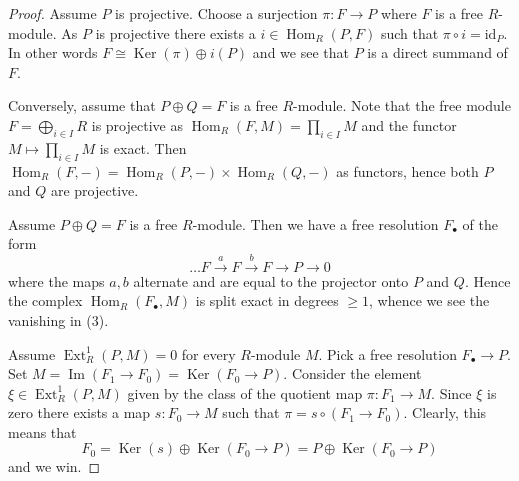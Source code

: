 \documentclass[10pt,a4paper]{amsart}
\theoremstyle{plain}
\theoremstyle{definition}
\theoremstyle{remark}
\numberwithin{equation}{subsection}
\def\Hom{\mathop{\mathrm{Hom}}\nolimits}
\def\Ext{\mathop{\mathrm{Ext}}\nolimits}
\def\Ker{\mathop{\mathrm{Ker}}}
\def\Im{\mathop{\mathrm{Im}}}
\begin{document}
\begin{proof}
Assume $P$ is projective. Choose a surjection $\pi : F \to P$ where $F$
is a free $R$-module. As $P$ is projective there exists a
$i \in \Hom_R(P, F)$ such that $\pi \circ i = \text{id}_P$.
In other words $F \cong \Ker(\pi) \oplus i(P)$ and we see
that $P$ is a direct summand of $F$.

\medskip\noindent
Conversely, assume that $P \oplus Q = F$ is a free $R$-module.
Note that the free module $F = \bigoplus_{i \in I} R$ is projective
as $\Hom_R(F, M) = \prod_{i \in I} M$ and the functor
$M \mapsto \prod_{i \in I} M$ is exact.
Then $\Hom_R(F, -) = \Hom_R(P, -) \times \Hom_R(Q, -)$
as functors, hence both $P$ and $Q$ are projective.

\medskip\noindent
Assume $P \oplus Q = F$ is a free $R$-module. Then we have a
free resolution $F_\bullet$ of the form
$$
\ldots F \xrightarrow{a} F \xrightarrow{b} F \to P \to 0
$$
where the maps $a, b$ alternate and are equal to the projector onto
$P$ and $Q$. Hence the complex $\Hom_R(F_\bullet, M)$ is split
exact in degrees $\geq 1$, whence we see the vanishing in (3).

\medskip\noindent
Assume $\Ext^1_R(P, M) = 0$ for every $R$-module $M$.
Pick a free resolution $F_\bullet \to P$. Set
$M = \Im(F_1 \to F_0) = \Ker(F_0 \to P)$.
Consider the element $\xi \in \Ext^1_R(P, M)$ given by
the class of the quotient map $\pi : F_1 \to M$. Since $\xi$ is zero
there exists a map $s : F_0 \to M$ such that $\pi = s \circ (F_1 \to F_0)$.
Clearly, this means that
$$
F_0 = \Ker(s) \oplus \Ker(F_0 \to P) =
P \oplus \Ker(F_0 \to P)
$$
and we win.
\end{proof}
\end{document}
